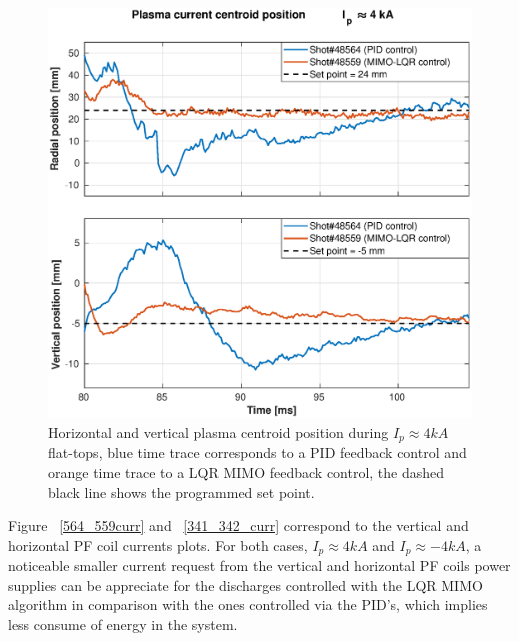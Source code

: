 \begin{figure}[h]
	\centering
	\includegraphics[width=1.1\textwidth]{Chp5/PIDvsMIMO_564_559_2.eps}
	\caption{ Horizontal and vertical plasma centroid position during  $I_p\approx 4kA$  flat-tops, blue time trace corresponds to a PID feedback control and orange time trace to a LQR MIMO feedback control, the dashed black line shows the programmed set point. \label{564_559}}
\end{figure}





 Figure ~\ref{564_559curr} and ~\ref{341_342_curr} correspond to the vertical and horizontal PF coil currents plots. For both cases, $I_p\approx 4kA$ and $I_p\approx -4kA$, a noticeable smaller current  request from the vertical and horizontal PF coils power supplies can be appreciate for the discharges controlled with the LQR MIMO algorithm in comparison with the ones controlled via the PID's, which implies  less consume of energy in the system.\smallskip

